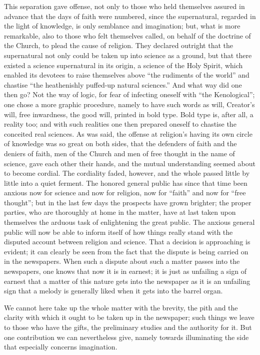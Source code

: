\documentclass[12pt,a4paper,openany]{book}
\newcommand{\opage}[1]{\marginnote{\footnotesize\textit{[#1]}}}
\begin{document}
This separation gave offense, not only to those who held themselves assured in advance that the days of faith were numbered, since the supernatural, regarded in the light of knowledge, is only semblance and imagination; but, what is more remarkable, also to those who felt themselves called, on behalf of the doctrine of the Church, to plead the cause of religion. They declared outright that the supernatural not only could be taken up into science as a ground, but that there existed a science supernatural in its origin, a science of the Holy Spirit, which enabled its devotees to raise themselves above ``the rudiments of the world'' and chastise ``the heathenishly puffed-up natural sciences.'' And what way did one then go? Not the way of logic, for fear of infecting oneself with ``the Kenological''; one chose a more graphic procedure, namely to have such words as will, Creator's will, free inwardness, the good will, printed in bold type. Bold type is, after all, a reality too; and with such realities one then prepared oneself to chastise the conceited real sciences. As was said, the offense at religion's having its own circle of knowledge was so great on both sides,
that the defenders of faith and the deniers of faith, men of the Church and men of free thought in the name of science, gave each other their hands, and the mutual understanding seemed about to become cordial. The cordiality faded, however, and the whole passed little by little into a quiet ferment. The honored general public has since that time been anxious now for science and now for religion, now for ``faith'' and now for ``free thought''; but
\setcounter{footnote}{0}%
\opage{30}in the last few days the prospects have grown brighter; the proper parties, who are thoroughly at home in the matter, have at last taken upon themselves the arduous task of enlightening the great public. The anxious general public will now be able to inform itself of how things really stand with the disputed account between religion and science. That a decision is approaching is evident; it can clearly be seen from the fact that the dispute is being carried on in the newspapers. When such a dispute about such a matter passes into the newspapers, one knows that now it is in earnest; it is just as unfailing a sign of earnest that a matter of this nature gets into the newspaper as it is an unfailing sign that a melody is generally liked when it gets into the barrel organ.

We cannot here take up the whole matter with the brevity, the pith and the clarity with which it ought to be taken up in the newspaper; such things we leave to those who have the gifts, the preliminary studies and the authority for it. But one contribution we can nevertheless give, namely towards illuminating the side that especially concerns imagination.
\end{document}
